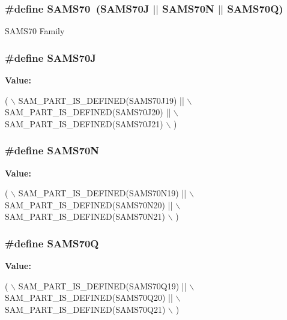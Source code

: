 \subsubsection[{S\+A\+M\+S70}]{\setlength{\rightskip}{0pt plus 5cm}\#define S\+A\+M\+S70~(S\+A\+M\+S70\+J $\vert$$\vert$ S\+A\+M\+S70\+N $\vert$$\vert$ S\+A\+M\+S70\+Q)}\label{group__sam__part__macros__group_ga8d375463839ea94bd1bdbe23a1f87213}
S\+A\+M\+S70 Family \hypertarget{group__sam__part__macros__group_gaf1a96c282da9b05972a653cf0b03b1a2}{}
\subsubsection[{S\+A\+M\+S70\+J}]{\setlength{\rightskip}{0pt plus 5cm}\#define S\+A\+M\+S70\+J}\label{group__sam__part__macros__group_gaf1a96c282da9b05972a653cf0b03b1a2}
{\bfseries Value\+:}
\begin{DoxyCode}
( \(\backslash\)
        SAM\_PART\_IS\_DEFINED(SAMS70J19) || \(\backslash\)
        SAM\_PART\_IS\_DEFINED(SAMS70J20) || \(\backslash\)
        SAM\_PART\_IS\_DEFINED(SAMS70J21) \(\backslash\)
    )
\end{DoxyCode}
\hypertarget{group__sam__part__macros__group_ga058ef2915b804280b5d38280a5b2bae3}{}
\subsubsection[{S\+A\+M\+S70\+N}]{\setlength{\rightskip}{0pt plus 5cm}\#define S\+A\+M\+S70\+N}\label{group__sam__part__macros__group_ga058ef2915b804280b5d38280a5b2bae3}
{\bfseries Value\+:}
\begin{DoxyCode}
( \(\backslash\)
        SAM\_PART\_IS\_DEFINED(SAMS70N19) || \(\backslash\)
        SAM\_PART\_IS\_DEFINED(SAMS70N20) || \(\backslash\)
        SAM\_PART\_IS\_DEFINED(SAMS70N21) \(\backslash\)
    )
\end{DoxyCode}
\hypertarget{group__sam__part__macros__group_ga3cc6724a7388e59987ccd2b9c9b3e0eb}{}
\subsubsection[{S\+A\+M\+S70\+Q}]{\setlength{\rightskip}{0pt plus 5cm}\#define S\+A\+M\+S70\+Q}\label{group__sam__part__macros__group_ga3cc6724a7388e59987ccd2b9c9b3e0eb}
{\bfseries Value\+:}
\begin{DoxyCode}
( \(\backslash\)
        SAM\_PART\_IS\_DEFINED(SAMS70Q19) || \(\backslash\)
        SAM\_PART\_IS\_DEFINED(SAMS70Q20) || \(\backslash\)
        SAM\_PART\_IS\_DEFINED(SAMS70Q21) \(\backslash\)
    )
\end{DoxyCode}
\hypertarget{group__sam__part__macros__group_gab470f27e045fe99f2b64bb30d5802282}{}
